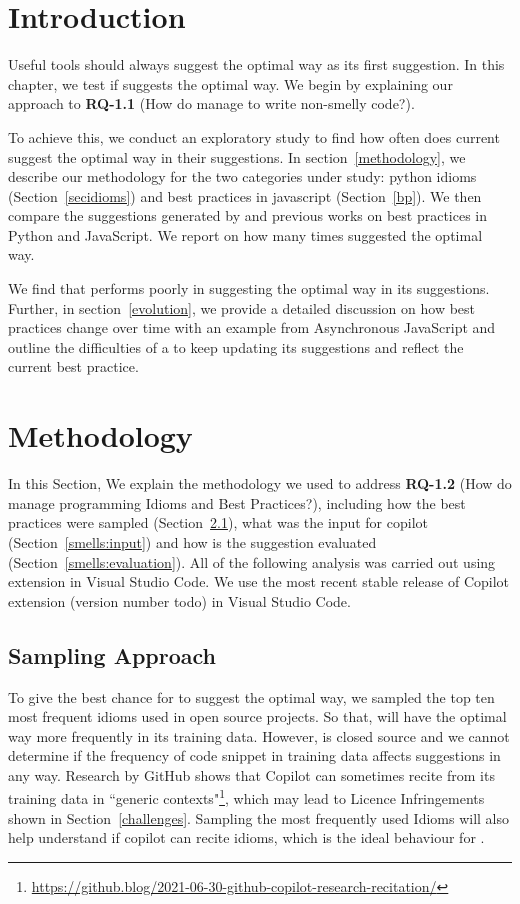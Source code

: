 \label{chapter:smells}

\section{Introduction}
Useful \AISE{} tools should always suggest the optimal way as its first suggestion. In this chapter, we test if \cop{} suggests the optimal way. 
We begin by explaining our approach to \textbf{RQ-1.1} (How do \cct{} manage to write non-smelly code?).

To achieve this, we conduct an exploratory study to find how often does current \cct{} suggest the optimal way in their suggestions. In section~\ref{methodology}, we describe our methodology for the two categories under study: python idioms (Section~\ref{secidioms}) and best practices in javascript (Section~\ref{bp}).
We then compare the suggestions generated by \cop{} and previous works on best practices in Python and JavaScript. We report on how many times \cop{} suggested the optimal way. 

We find that \cop{} performs poorly in suggesting the optimal way in its suggestions. Further, in section~\ref{evolution}, we provide a detailed discussion on how best practices change over time with an example from Asynchronous JavaScript and outline the difficulties of a \cct{} to keep updating its suggestions and reflect the current best practice.


\section{Methodology}
\label{smells:methodology}
In this Section, We explain the methodology we used to address \textbf{RQ-1.2} (How do \cct{} manage programming Idioms and Best Practices?), including how the best practices were sampled (Section~\ref{smells:sampling}), what was the input for copilot (Section~\ref{smells:input}) and how is the suggestion evaluated (Section~\ref{smells:evaluation}). All of the following analysis was carried out using \cop{} extension in Visual Studio Code. We use the most recent stable release of Copilot extension (version number todo) in Visual Studio Code.

\subsection{Sampling Approach}
\label{smells:sampling}
To give the best chance for \cop{} to suggest the optimal way, we sampled the top ten most frequent idioms used in open source projects. So that, \cop{} will have the optimal way more frequently in its training data. However, \cop{} is closed source and we cannot determine if the frequency of code snippet in training data affects \cop{} suggestions in any way. Research by GitHub shows that Copilot can sometimes recite from its training data in ``generic contexts"\footnote{\url{https://github.blog/2021-06-30-github-copilot-research-recitation/}}, which may lead to Licence Infringements shown in Section~\ref{challenges}. Sampling the most frequently used Idioms will also help understand if copilot can recite idioms, which is the ideal behaviour for \cct{}.

